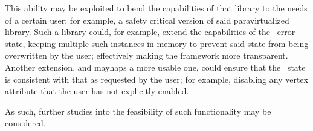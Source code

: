 This ability may be exploited to bend the capabilities of that library to the needs of a certain user; for example, a safety critical version of said paravirtualized library.
Such a library could, for example, extend the capabilities of the \dvttermopengl\ error state, keeping multiple such instances in memory to prevent said state from being overwritten by the user; effectively making the framework more transparent.
Another extension, and mayhaps a more usable one, could ensure that the \dvttermopengl\ state is consistent with that as requested by the user; for example, disabling any vertex attribute that the user has not explicitly enabled.

As such, further studies into the feasibility of such functionality may be considered.
